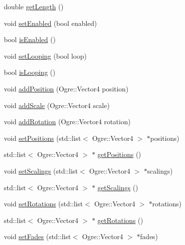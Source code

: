 \begin{DoxyCompactItemize}
double \hyperlink{class_rad_xml_1_1_animation_track_aa9bcc77cbd0055cd6aa9ba5107ab1948}{get\-Length} ()
\item 
void \hyperlink{class_rad_xml_1_1_animation_track_a01219a57021878f116b9cec25e6f252d}{set\-Enabled} (bool enabled)
\item 
bool \hyperlink{class_rad_xml_1_1_animation_track_ae5f2b5767b8f3bb06f3187ffe7dbec45}{is\-Enabled} ()
\item 
void \hyperlink{class_rad_xml_1_1_animation_track_a8b04a09bd2255501a311dbecc16e6050}{set\-Looping} (bool loop)
\item 
bool \hyperlink{class_rad_xml_1_1_animation_track_a6faa51e87664ae6f0b995ace180b8035}{is\-Looping} ()
\item 
void \hyperlink{class_rad_xml_1_1_animation_track_afeea908c0d45fa620ee078688746dc99}{add\-Position} (Ogre\-::\-Vector4 position)
\item 
void \hyperlink{class_rad_xml_1_1_animation_track_a16b0f36b3f042782d933d65f817b74f7}{add\-Scale} (Ogre\-::\-Vector4 scale)
\item 
void \hyperlink{class_rad_xml_1_1_animation_track_ab67353a570dfb3ba866d3de6898e96b9}{add\-Rotation} (Ogre\-::\-Vector4 rotation)
\item 
void \hyperlink{class_rad_xml_1_1_animation_track_ab098ce49198ec50d543788890bd31159}{set\-Positions} (std\-::list$<$ Ogre\-::\-Vector4 $>$ $\ast$positions)
\item 
std\-::list$<$ Ogre\-::\-Vector4 $>$ $\ast$ \hyperlink{class_rad_xml_1_1_animation_track_a2b786600d7718428d8160e420c83d939}{get\-Positions} ()
\item 
void \hyperlink{class_rad_xml_1_1_animation_track_aa4f80c7b9786cee8f4cd14fc46701f82}{set\-Scalings} (std\-::list$<$ Ogre\-::\-Vector4 $>$ $\ast$scalings)
\item 
std\-::list$<$ Ogre\-::\-Vector4 $>$ $\ast$ \hyperlink{class_rad_xml_1_1_animation_track_a391b78171f1d8466c08208e794cb12ab}{get\-Scalings} ()
\item 
void \hyperlink{class_rad_xml_1_1_animation_track_a11d9cdbd50bb8fa6342a2f9036f66ca7}{set\-Rotations} (std\-::list$<$ Ogre\-::\-Vector4 $>$ $\ast$rotations)
\item 
std\-::list$<$ Ogre\-::\-Vector4 $>$ $\ast$ \hyperlink{class_rad_xml_1_1_animation_track_afb7de5b0fa85d681146dfecf5f97bfbb}{get\-Rotations} ()
\item 
void \hyperlink{class_rad_xml_1_1_animation_track_a6df47cd2a803bc753b2359d8f28a6768}{set\-Fades} (std\-::list$<$ Ogre\-::\-Vector4 $>$ $\ast$fades)

\end{DoxyCompactItemize}
